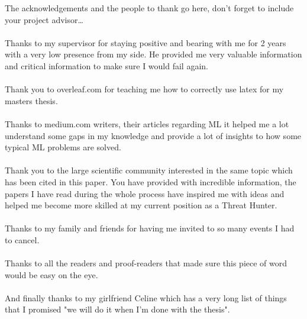 \documentclass[
11pt, %
english, %
singlespacing, %
headsepline, %
]{MastersDoctoralThesis} %
\begin{document}
\begin{acknowledgements}
\addchaptertocentry{\acknowledgementname} %
The acknowledgements and the people to thank go here, don't forget to include your project advisor\ldots\\\\
Thanks to my supervisor for staying positive and bearing with me for 2 years with a very low presence from my side. He provided me very valuable information and critical information to make sure I would fail again.\\\\
Thank you to overleaf.com for teaching me how to correctly use latex for my masters thesis.\\\\
Thanks to medium.com writers, their articles regarding ML it helped me a lot understand some gaps in my knowledge and provide a lot of insights to how some typical ML problems are solved.\\\\
Thank you to the large scientific community interested in the same topic which has been cited in this paper. You have provided with incredible information, the papers I have read during the whole process have inspired me with ideas and helped me become more skilled at my current position as a Threat Hunter.\\ \\
Thanks to my family and friends for having me invited to so many events I had to cancel.\\\\
Thanks to all the readers and proof-readers that made sure this piece of word would be easy on the eye.\\\\
And finally thanks to my girlfriend Celine which has a very long list of things that I promised "we will do it when I'm done with the thesis".
\end{acknowledgements}


\tableofcontents %

\listoffigures %

\listoftables %
\end{document}
